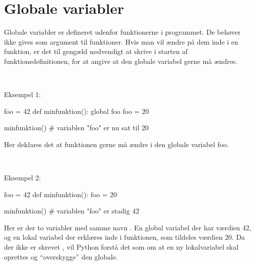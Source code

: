 \documentclass{../../handout}
\begin{document}
\chapter{Globale variabler}
Globale variabler er defineret udenfor funktionerne i programmet. De
behøver ikke gives som argument til funktioner. Hvis man vil ændre på
dem inde i en funktion, er det til gengæld nødvendigt at skrive
 i starten af funktionsdefinitionen, for at angive at
den globale variabel  gerne må ændres.

~

\noindent
Eksempel 1:
\begin{python}
foo = 42
def minfunktion():
    global foo
    foo = 20

minfunktion()
# variablen "foo" er nu sat til 20
\end{python}
Her deklares det at funktionen  gerne må ændre i den
globale variabel foo.

~

\noindent
Eksempel 2:
\begin{python}
foo = 42
def minfunktion():
    foo = 20

minfunktion()
# variablen "foo" er stadig 42
\end{python}
Her er der to variabler med samme navn . En global variabel
der har værdien 42, og en lokal variabel der erklæres inde i
funktionen, som tildeles værdien 20. Da der ikke er skrevet
, vil Python forstå det som om at en ny lokalvariabel
skal oprettes og ``overskygge'' den globale.
\end{document}
